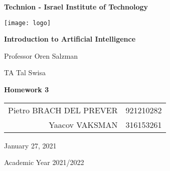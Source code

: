 \begin{titlepage}
\begin{center}
    \textbf{\LARGE Technion - Israel Institute of Technology}

    \vspace{1.5cm}

    \texttt{[image: logo]}

    \vspace{2.5cm}

    \textbf{\LARGE Introduction to Artificial Intelligence}

    \vspace{1cm}

    {\Large Professor Oren Salzman}

    \vspace{2mm}

    {\Large TA Tal Swisa}

    \vfill

    \textbf{\Huge Homework 3}

    \vspace{2cm}

    \begin{tabular}[c]{ r l } %
        Pietro BRACH DEL PREVER & 921210282\\
        Yaacov VAKSMAN  & 316153261\\

    \end{tabular}

    \vspace{2cm}

    {\normalsize January 27, 2021}

    \vspace{1mm}

    {\normalsize Academic Year 2021/2022}
\end{center}
\end{titlepage}

